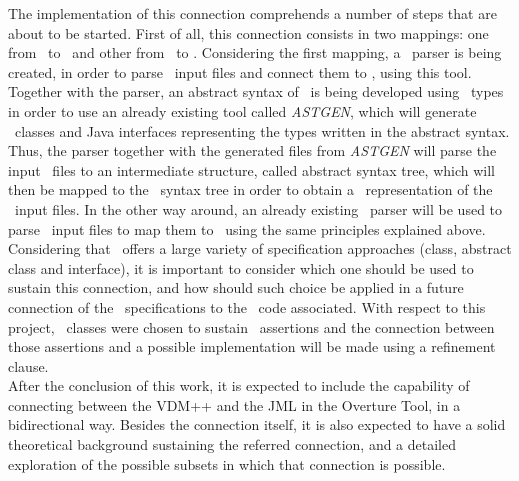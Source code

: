 The implementation of this connection comprehends a number of steps that are about to be started. First of all, this connection consists in two mappings: one from \jml\ to \vpp\ and other from \vpp\ to \jml. Considering the first mapping, a \jml\ parser is being created, in order to parse \jml\ input files and connect them to \vpp, using this tool. Together with the parser, an abstract syntax of \jml\ is being developed using \vdm\ types in order to use an already existing tool called \textit{ASTGEN}, which will generate \vpp\ classes and Java interfaces representing the types written in the abstract syntax. Thus, the parser together with the generated files from \textit{ASTGEN} will parse the input \jml\ files to an intermediate structure, called abstract syntax tree, which will then be mapped to the \vpp\ syntax tree in order to obtain a \vpp\ representation of the \jml\ input files. In the other way around, an already existing \vpp\ parser will be used to parse \vpp\ input files to map them to \jml\ using the same principles explained above.\\
Considering that \jml\ offers a large variety of specification approaches (class, abstract class and interface), it is important to consider which one should be used to sustain this connection, and how should such choice be applied in a future connection of the \jml\ specifications to the \java\ code associated. With respect to this project, \java\ classes were chosen to sustain \jml\ assertions and the connection between those assertions and a possible implementation will be made using a refinement clause.\\

After the conclusion of this work, it is expected to include the capability of connecting between the VDM++ and the JML in the Overture Tool, in a bidirectional way. Besides the connection itself, it is also expected to have a solid theoretical background sustaining the referred connection, and a detailed exploration of the possible subsets in which that connection is possible.\\








